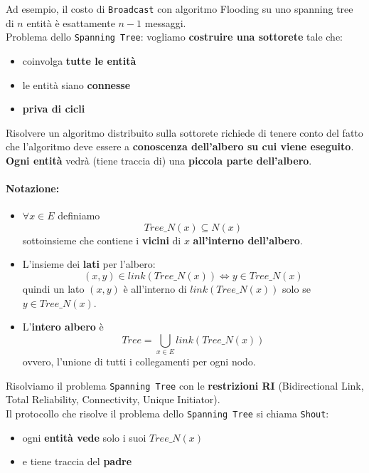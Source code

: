 Ad esempio, il costo di \texttt{Broadcast} con algoritmo Flooding su uno spanning tree di $n$ entità è esattamente $n-1$ messaggi.\\

Problema dello \texttt{Spanning Tree}: vogliamo \textbf{costruire una sottorete} tale che: 
\begin{itemize}
	\item coinvolga \textbf{tutte le entità}
	\item le entità siano \textbf{connesse}
	\item \textbf{priva di cicli}
\end{itemize}

Risolvere un algoritmo distribuito sulla sottorete richiede di tenere conto del fatto che l'algoritmo deve essere a \textbf{conoscenza dell'albero su cui viene eseguito}. \textbf{Ogni entità} vedrà (tiene traccia di) una \textbf{piccola parte dell'albero}.\\

\newpage

\paragraph{Notazione:} 
\begin{itemize}
	\item $\forall x \in E$ definiamo 
	$$ Tree\_N(x) \subseteq N(x) $$
	sottoinsieme che contiene i \textbf{vicini} di $x$ \textbf{all'interno dell'albero}.\\
	
	\item L'insieme dei \textbf{lati} per l'albero:
	$$ (x,y) \in link(Tree\_N(x)) \Leftrightarrow y \in Tree\_N (x) $$
	quindi un lato $(x,y)$ è all'interno di $link(Tree\_N(x))$ solo se $y \in Tree\_N (x)$.\\
	
	\item L'\textbf{intero albero} è
	$$ Tree = \bigcup_{x \in E} link(Tree\_N(x)) $$
	ovvero, l'unione di tutti i collegamenti per ogni nodo.\\
\end{itemize}

Risolviamo il problema \texttt{Spanning Tree} con le \textbf{restrizioni RI} (Bidirectional Link, Total Reliability, Connectivity, Unique Initiator).\\

Il protocollo che risolve il problema dello \texttt{Spanning Tree} si chiama \texttt{Shout}:
\begin{itemize}
	\item ogni \textbf{entità vede} solo i suoi $Tree\_N(x)$
	\item e tiene traccia del \textbf{padre}
\end{itemize}

